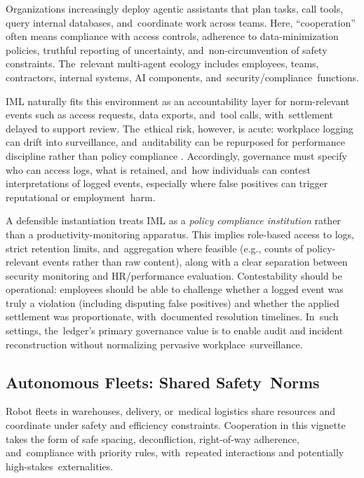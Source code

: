 \documentclass[mca,article,accept,pdftex,oneauthor]{Definitions/mdpi}
\begin{document}
Organizations increasingly deploy agentic assistants that plan tasks, call tools, query internal databases, and~coordinate work across teams. Here, ``cooperation'' often means compliance with access controls, adherence to data-minimization policies, truthful reporting of uncertainty, and~non-circumvention of safety constraints. The~relevant multi-agent ecology includes employees, teams, contractors, internal systems, AI components, and~security/compliance~functions.

IML naturally fits this environment as an accountability layer for norm-relevant events such as access requests, data exports, and~tool calls, with~settlement delayed to support review. The~ethical risk, however, is acute: workplace logging can drift into surveillance, and~auditability can be repurposed for performance discipline rather than policy compliance \citep{Zuboff2019,Lyon2007Surveillance}. Accordingly, governance must specify who can access logs, what is retained, and~how individuals can contest interpretations of logged events, especially where false positives can trigger reputational or employment~harm.

A defensible instantiation treats IML as a \emph{policy compliance institution} rather than a productivity-monitoring apparatus. This implies role-based access to logs, strict retention limits, and~aggregation where feasible (e.g., counts of policy-relevant events rather than raw content), along with a clear separation between security monitoring and HR/performance evaluation. Contestability should be operational: employees should be able to challenge whether a logged event was truly a violation (including disputing false positives) and whether the applied settlement was proportionate, with~documented resolution timelines. In~such settings, the~ledger’s primary governance value is to enable audit and incident reconstruction without normalizing pervasive workplace~surveillance.

\subsection{Autonomous Fleets: Shared Safety~Norms}

Robot fleets in warehouses, delivery, or~medical logistics share resources and coordinate under safety and efficiency constraints. Cooperation in this vignette takes the form of safe spacing, deconfliction, right-of-way adherence, and~compliance with priority rules, with~repeated interactions and potentially high-stakes~externalities.
\end{document}

